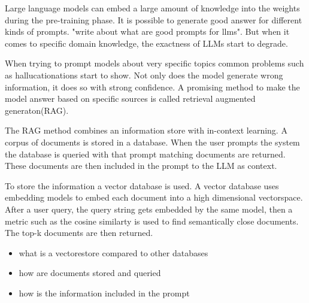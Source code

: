 \documentclass[../../main.tex]{subfiles}
\begin{document}
Large language models can embed a large amount of knowledge into the weights during the pre-training phase.
It is possible to generate good answer for different kinds of prompts.
"write about what are good prompts for llms".
But when it comes to specific domain knowledge, the exactness of LLMs start to degrade.

When trying to prompt models about very specific topics common problems such as hallucationations start to show.
Not only does the model generate wrong information, it does so with strong confidence.
A promising method to make the model answer based on specific sources is called retrieval augmented generaton(RAG).

The RAG method combines an information store with in-context learning.
A corpus of documents is stored in a database.
When the user prompts the system the database is queried with that prompt matching documents are returned.
These documents are then included in the prompt to the LLM as context.

To store the information a vector database is used.
A vector database uses embedding models to embed each document into a high dimensional vectorspace.
After a user query, the query string gets embedded by the same model, then a metric such as the cosine similarty is used to find semantically close documents.
The top-k documents are then returned.



\begin{itemize}
	\item what is a vectorestore compared to other databases
	\item how are documents stored and queried
	\item how is the information included in the prompt
\end{itemize}
\end{document}
